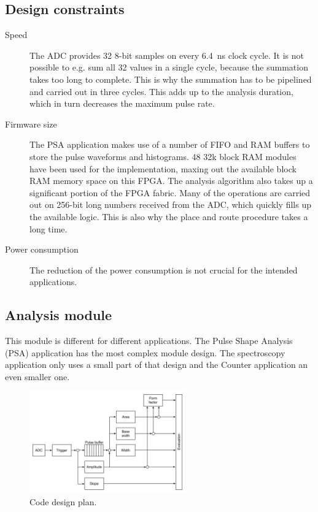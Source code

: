 \subsection{Design constraints}
\begin{description}
\item[Speed] The ADC provides 32 8-bit samples on every 6.4~ns clock cycle. It is not possible to e.g. sum all 32 values in a single cycle, because the summation takes too long to complete. This is why the summation has to be pipelined and carried out in three cycles. This adds up to the analysis duration, which in turn decreases the maximum pulse rate.
\item[Firmware size] The PSA application makes use of a number of FIFO and RAM buffers to store the pulse waveforms and histograms. 48 32k block RAM modules have been used for the implementation, maxing out the available block RAM memory space on this FPGA. The analysis algorithm also takes up a significant portion of the FPGA fabric. Many of the operations are carried out on 256-bit long numbers received from the ADC, which quickly fills up the available logic. This is also why the place and route procedure takes a long time.
\item[Power consumption] The reduction of the power consumption is not crucial for the intended applications.
\end{description}


\subsection{Analysis module}
\label{subsec:algorithm}
This module is different for different applications. The Pulse Shape Analysis (PSA) application has the most complex module design. The spectroscopy application only uses a small part of that design and the Counter application an even smaller one.


\begin{figure}[!t]
\centering
\includegraphics[width=0.6\textwidth]{05_current_monitoring/plots/analysis1}
\caption{Code design plan.}
\label{fig:architecture}
\end{figure}


